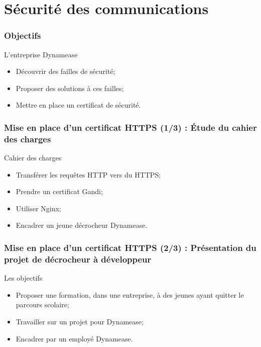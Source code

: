 \section{Sécurité des communications}
\author{Kévin Moreau}


\begin{frame}
	\frametitle{Objectifs}

	\begin{block}{L'entreprise Dynamease}
	 \begin{itemize}
      \item Découvrir des failles de sécurité;
      \item Proposer des solutions à ces failles;
      \item Mettre en place un certificat de sécurité.
	 \end{itemize}
	\end{block}
\end{frame}

\begin{frame}
	\frametitle{Mise en place d'un certificat HTTPS (1/3) : Étude du cahier des charges}

	\begin{block}{Cahier des charges}
	 \begin{itemize}
      \item Transférer les requêtes HTTP vers du HTTPS;
      \item Prendre un certificat Gandi;
      \item Utiliser Nginx;
      \item Encadrer un jeune décrocheur Dynamease.
	 \end{itemize}
	\end{block}
\end{frame}

\begin{frame}
	\frametitle{Mise en place d'un certificat HTTPS (2/3) : Présentation du projet de décrocheur à développeur}

	\begin{block}{Les objectifs}
		\begin{itemize}
	 		\item Proposer une formation, dans une entreprise, à des jeunes ayant quitter le parcours scolaire;
	 		\item Travailler sur un projet pour Dynamease;
	 		\item Encadrer par un employé Dynamease.
	 	\end{itemize}
	\end{block}
\end{frame}

